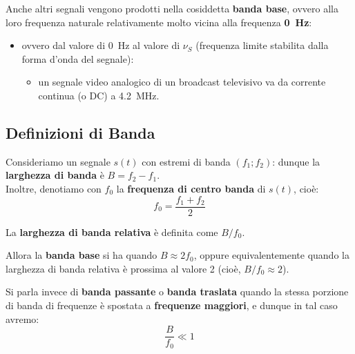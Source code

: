 \documentclass[openany,a4paper,12pt]{book}
\begin{document}
Anche altri segnali vengono prodotti nella cosiddetta \textbf{banda base}, ovvero alla loro frequenza naturale relativamente molto vicina alla frequenza \textbf{\qty{0}{\hertz}}:
\begin{itemize}[label=\textcolor{PoliBlue}{\textbullet}]
    \item ovvero dal valore di \qty{0}{\hertz} al valore di $\nu_S$ (frequenza limite stabilita dalla forma d'onda del segnale):
    \begin{itemize}[label=$\circ$]
        \item un segnale video analogico di un broadcast televisivo va da corrente continua (o DC) a \qty{4.2}{\mega\hertz}.
    \end{itemize}
\end{itemize}

\subsection*{Definizioni di Banda}
Consideriamo un segnale $s(t)$ con estremi di banda $(f_1; f_2)$: dunque la \textbf{larghezza di banda} è $B = f_2 - f_1$. \\
Inoltre, denotiamo con $f_0$ la \textbf{frequenza di centro banda} di $s(t)$, cioè:
\begin{equation}
    f_0 = \frac{f_1 + f_2}{2}
\end{equation}

La \textbf{larghezza di banda relativa} è definita come $B / f_0$.

\begin{nota}
    Allora la \textbf{banda base} si ha quando $B \approx 2f_0$, oppure equivalentemente quando la larghezza di banda relativa è prossima al valore 2 (cioè, $B / f_0 \approx 2$).
\end{nota}

Si parla invece di \textbf{banda passante} o \textbf{banda traslata} quando la stessa porzione di banda di frequenze è spostata a \textbf{frequenze maggiori}, e dunque in tal caso avremo:
\begin{equation}
    \frac{B}{f_0} \ll 1
\end{equation}

\vspace{0.5cm}
\end{document}
